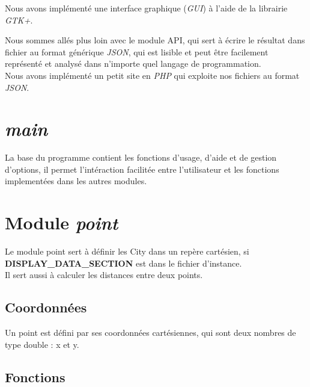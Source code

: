 \documentclass[12pt]{report}
\begin{document}

Nous avons implémenté une interface graphique (\textit{GUI}) à l'aide de la librairie \textit{GTK+}.

Nous sommes allés plus loin avec le module API, qui sert à écrire le résultat dans fichier au format générique \textit{JSON}, qui est lisible et peut être facilement représenté et analysé dans n'importe quel langage de programmation.\\
Nous avons implémenté un petit site en \textit{PHP} qui exploite nos fichiers au format \textit{JSON}. \\



\section{\textit{main}}

La base du programme contient les fonctions d'usage, d'aide et de gestion d'options, il permet l'intéraction facilitée entre l'utilisateur et les fonctions implementées dans les autres modules. \\


\section{Module \textit{point}}

Le module point sert à définir les City dans un repère cartésien, si \textbf{DISPLAY\_DATA\_SECTION} est dans le fichier d'instance. \\
Il sert aussi à calculer les distances entre deux points.

\subsection{Coordonnées}

Un point est défini par ses coordonnées cartésiennes, qui sont deux nombres de type double : x et y.

\subsection{Fonctions}
\end{document}
